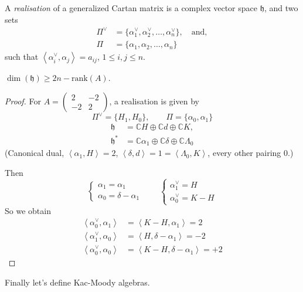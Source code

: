 \begin{definition}
\label{definition-realisation}
A {\it realisation} of a generalized Cartan matrix is a complex vector space
 $\mathfrak{h}$, and two sets
\begin{align*}
\Pi^\vee&=\{\alpha_1^\vee, \alpha_2^\vee,\ldots,\alpha_n^\vee\},\quad
\text{and},\\
\Pi&=\{\alpha_1,\alpha_2,\ldots,\alpha_n\}
\end{align*}
such that $\left<\alpha_i^\vee,\alpha_j\right>=a_{ij}$, $1\leq i,j\leq n$.
\end{definition}

\begin{exercise}
\label{exercise-realisation}
$\dim(\mathfrak{h})\geq 2n-\text{rank}(A)$.
\end{exercise}

\begin{proof}
For $A=\begin{pmatrix}
2&-2\\ 
-2&2
\end{pmatrix}$, a realisation is given by
$$
\Pi^\vee=\{H_1,H_0\},\qquad \Pi=\{\alpha_0,\alpha_1\}
$$
\begin{align*}
\mathfrak{h}&=\mathbb{C}H\oplus\mathbb{C}d\oplus\mathbb{C}K,\\
\mathfrak{h}^*&=\mathbb{C}\alpha_1\oplus\mathbb{C}\delta
\oplus\mathbb{C}\Lambda_0
\end{align*}
(Canonical dual, $\left<\alpha_1,H\right>=2$, 
$\left<\delta,d\right>=1=\left<\Lambda_0,K\right>$, every other pairing $0$.)

Then
$$
\begin{cases}
\alpha_1=\alpha_1\\
\alpha_0=\delta-\alpha_1
\end{cases}\qquad 
\begin{cases}
\alpha_1^\vee=H \\
\alpha_0^\vee = K-H
\end{cases}
$$
So we obtain
\begin{align*}
\left<\alpha_0^\vee,\alpha_1\right>&=\left<K-H,\alpha_1\right>=2\\
\left<\alpha_1^\vee,\alpha_0\right>&=\left<H,\delta-\alpha_1\right>=-2\\
\left<\alpha_0^\vee,\alpha_0\right>&=\left<K-H,\delta-\alpha_1\right>=+2
\end{align*}

\end{proof}

\medskip\noindent
Finally let's define Kac-Moody algebras.

